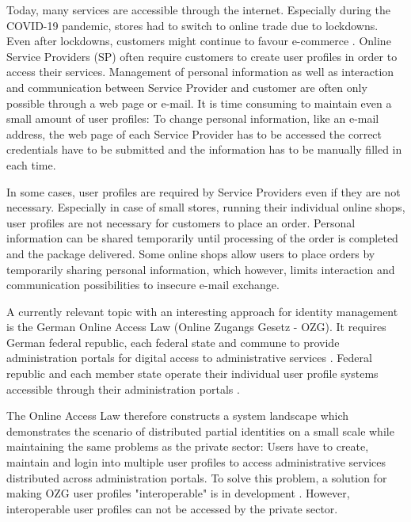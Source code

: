 Today, many services are accessible through the internet. Especially during the COVID-19 pandemic, stores had to switch to online trade due to lockdowns. Even after lockdowns, customers might continue to favour e-commerce \cite{9076858}. Online Service Providers (SP) often require customers to create user profiles in order to access their services. Management of personal information as well as interaction and communication between Service Provider and customer are often only possible through a web page or e-mail. It is time consuming to maintain even a small amount of user profiles: To change personal information, like an e-mail address, the web page of each Service Provider has to be accessed the correct credentials have to be submitted and the information has to be manually filled in each time.

In some cases, user profiles are required by Service Providers even if they are not necessary. Especially in case of small stores, running their individual online shops, user profiles are not necessary for customers to place an order. Personal information can be shared temporarily until processing of the order is completed and the package delivered. Some online shops allow users to place orders by temporarily sharing personal information, which however, limits interaction and communication possibilities to insecure e-mail exchange.

A currently relevant topic with an interesting approach for identity management is the German Online Access Law (Online Zugangs Gesetz - OZG). It requires German federal republic, each federal state and commune to provide administration portals for digital access to administrative services \cite{ozg:general}. Federal republic and each member state operate their individual user profile systems accessible through their administration portals \cite{ozg:user_profiles_general}. 

The Online Access Law therefore constructs a system landscape which demonstrates the scenario of distributed partial identities on a small scale while maintaining the same problems as the private sector: Users have to create, maintain and login into multiple user profiles to access administrative services distributed across administration portals. To solve this problem, a solution for making OZG user profiles "interoperable" is in development \cite{ozg:user_profiles_general}. However, interoperable user profiles can not be accessed by the private sector.

